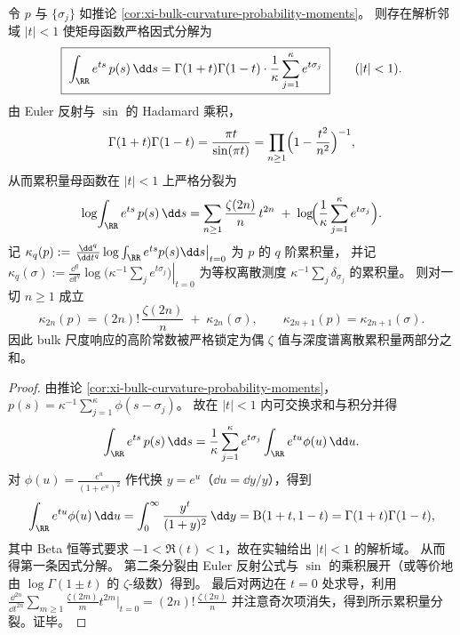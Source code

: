 \begin{proposition}\label{prop:xi-bulk-curvature-mgf-factorization-zeta-tower}
令 \(p\) 与 \(\{\sigma_j\}\) 如推论 \ref{cor:xi-bulk-curvature-probability-moments}。
则存在解析邻域 \(|t|<1\) 使矩母函数严格因式分解为
\[
\boxed{\;
\int_{\RR}e^{ts}\,p(s)\,\dd s
=\Gamma(1+t)\Gamma(1-t)\cdot \frac{1}{\kappa}\sum_{j=1}^{\kappa}e^{t\sigma_j}\;}
\qquad(|t|<1).
\]
由 Euler 反射与 \(\sin\) 的 Hadamard 乘积，
\[
\Gamma(1+t)\Gamma(1-t)=\frac{\pi t}{\sin(\pi t)}
=\prod_{n\ge 1}\Bigl(1-\frac{t^2}{n^2}\Bigr)^{-1},
\]
从而累积量母函数在 \(|t|<1\) 上严格分裂为
\[
\log\!\int_{\RR}e^{ts}\,p(s)\,\dd s
=\sum_{n\ge 1}\frac{\zeta(2n)}{n}\,t^{2n}
\;+\;\log\!\Bigl(\frac{1}{\kappa}\sum_{j=1}^{\kappa}e^{t\sigma_j}\Bigr).
\]
记 \(\kappa_q(p):=\left.\frac{\dd^q}{\dd t^q}\log\int_{\RR}e^{ts}p(s)\dd s\right|_{t=0}\) 为 \(p\) 的 \(q\) 阶累积量，
并记 \(\kappa_q(\sigma):=\left.\frac{\dd^q}{\dd t^q}\log\bigl(\kappa^{-1}\sum_j e^{t\sigma_j}\bigr)\right|_{t=0}\) 为等权离散测度 \(\kappa^{-1}\sum_j\delta_{\sigma_j}\) 的累积量。
则对一切 \(n\ge 1\) 成立
\[
\boxed{\;
\kappa_{2n}(p)=(2n)!\,\frac{\zeta(2n)}{n}\;+\;\kappa_{2n}(\sigma),
\qquad
\kappa_{2n+1}(p)=\kappa_{2n+1}(\sigma).\;}
\]
因此 bulk 尺度响应的高阶常数被严格锁定为偶 \(\zeta\) 值与深度谱离散累积量两部分之和。
\end{proposition}
\begin{proof}
由推论 \ref{cor:xi-bulk-curvature-probability-moments}，
\(
p(s)=\kappa^{-1}\sum_{j=1}^\kappa \phi(s-\sigma_j)
\)。
故在 \(|t|<1\) 内可交换求和与积分并得
\[
\int_{\RR}e^{ts}\,p(s)\,\dd s
=\frac{1}{\kappa}\sum_{j=1}^{\kappa}e^{t\sigma_j}\int_{\RR}e^{tu}\phi(u)\,\dd u.
\]
对 \(\phi(u)=\frac{e^{u}}{(1+e^{u})^{2}}\) 作代换 \(y=e^{u}\)（\(\dd u=\dd y/y\)），得到
\[
\int_{\RR}e^{tu}\phi(u)\,\dd u
=\int_{0}^{\infty}\frac{y^{t}}{(1+y)^{2}}\,\dd y
=\mathrm{B}(1+t,1-t)
=\Gamma(1+t)\Gamma(1-t),
\]
其中 Beta 恒等式要求 \(-1<\Re(t)<1\)，故在实轴给出 \(|t|<1\) 的解析域。
从而得第一条因式分解。
第二条分裂由 Euler 反射公式与 \(\sin\) 的乘积展开（或等价地由 \(\log\Gamma(1\pm t)\) 的 \(\zeta\)-级数）得到。
最后对两边在 \(t=0\) 处求导，利用
\(
\frac{\dd^{2n}}{\dd t^{2n}}\sum_{m\ge 1}\frac{\zeta(2m)}{m}t^{2m}\big|_{t=0}
=(2n)!\,\frac{\zeta(2n)}{n}
\)
并注意奇次项消失，得到所示累积量分裂。证毕。
\end{proof}

